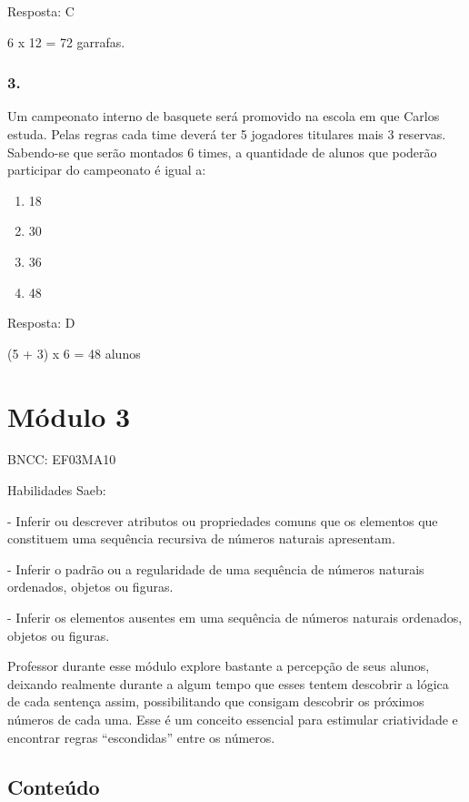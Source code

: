 Resposta: C

6 x 12 = 72 garrafas.

\subsubsection{3.}\label{section-32}

Um campeonato interno de basquete será promovido na escola em que Carlos
estuda. Pelas regras cada time deverá ter 5 jogadores titulares mais 3
reservas. Sabendo-se que serão montados 6 times, a quantidade de alunos
que poderão participar do campeonato é igual a:

\begin{enumerate}
\def\labelenumi{\alph{enumi})}
\item
  18
\item
  30
\item
  36
\item
  48
\end{enumerate}

Resposta: D

(5 + 3) x 6 = 48 alunos

\section{Módulo 3}\label{muxf3dulo-3}

BNCC: EF03MA10

Habilidades Saeb:

- Inferir ou descrever atributos ou propriedades comuns que os elementos
que constituem uma sequência recursiva de números naturais apresentam.

- Inferir o padrão ou a regularidade de uma sequência de números
naturais ordenados, objetos ou figuras.

- Inferir os elementos ausentes em uma sequência de números naturais
ordenados, objetos ou figuras.

Professor durante esse módulo explore bastante a percepção de seus
alunos, deixando realmente durante a algum tempo que esses tentem
descobrir a lógica de cada sentença assim, possibilitando que consigam
descobrir os próximos números de cada uma. Esse é um conceito essencial
para estimular criatividade e encontrar regras ``escondidas'' entre os
números.

\subsection{Conteúdo}\label{conteuxfado-2}

